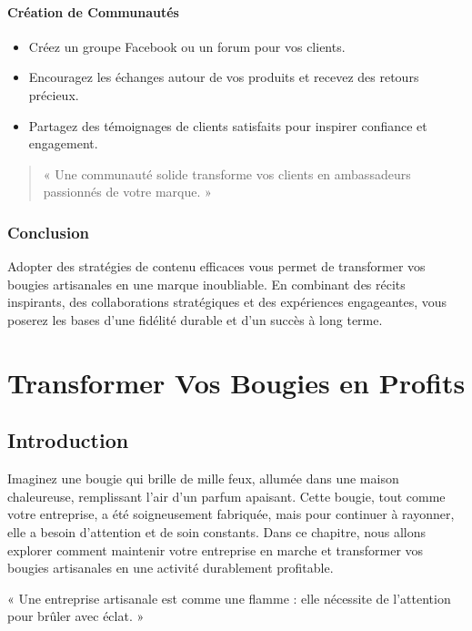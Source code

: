 \documentclass[11pt,fleqn,onecolumn,oneside]{book}
\begin{document}
\subsubsection*{Création de Communautés}

\begin{itemize}
    \item Créez un groupe Facebook ou un forum pour vos clients.
    \item Encouragez les échanges autour de vos produits et recevez des retours précieux.
    \item Partagez des témoignages de clients satisfaits pour inspirer confiance et engagement.
\end{itemize}

\begin{quote}
« Une communauté solide transforme vos clients en ambassadeurs passionnés de votre marque. »
\end{quote}

\subsection*{Conclusion}

Adopter des stratégies de contenu efficaces vous permet de transformer vos bougies artisanales en une marque inoubliable. En combinant des récits inspirants, des collaborations stratégiques et des expériences engageantes, vous poserez les bases d’une fidélité durable et d’un succès à long terme.

\chapter{Transformer Vos Bougies en Profits}

\section{Introduction}

Imaginez une bougie qui brille de mille feux, allumée dans une maison chaleureuse, remplissant l’air d’un parfum apaisant. Cette bougie, tout comme votre entreprise, a été soigneusement fabriquée, mais pour continuer à rayonner, elle a besoin d’attention et de soin constants. Dans ce chapitre, nous allons explorer comment maintenir votre entreprise en marche et transformer vos bougies artisanales en une activité durablement profitable.

\begin{remark}
« Une entreprise artisanale est comme une flamme : elle nécessite de l’attention pour brûler avec éclat. » 
\end{remark}
\end{document}
